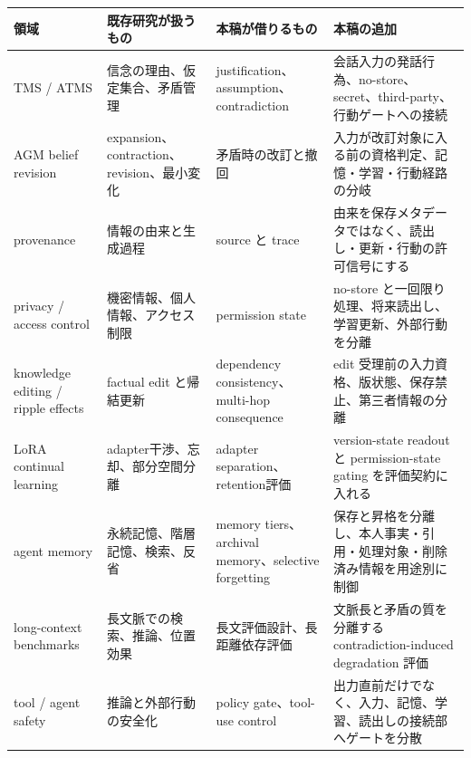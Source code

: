 \documentclass[12pt,a4paper]{article}
\begin{document}
{\def\LTcaptype{table} %
\begin{longtable}[]{@{}
  >{\raggedright\arraybackslash}p{}
  >{\raggedright\arraybackslash}p{}
  >{\raggedright\arraybackslash}p{}
  >{\raggedright\arraybackslash}p{}@{}}
\toprule\noalign{}
\begin{minipage}[b]{\linewidth}\raggedright
領域
\end{minipage} & \begin{minipage}[b]{\linewidth}\raggedright
既存研究が扱うもの
\end{minipage} & \begin{minipage}[b]{\linewidth}\raggedright
本稿が借りるもの
\end{minipage} & \begin{minipage}[b]{\linewidth}\raggedright
本稿の追加
\end{minipage} \\
\midrule\noalign{}
\endhead
\bottomrule\noalign{}
\endlastfoot
TMS / ATMS & 信念の理由、仮定集合、矛盾管理 & justification、assumption、contradiction & 会話入力の発話行為、no-store、secret、third-party、行動ゲートへの接続 \\
AGM belief revision & expansion、contraction、revision、最小変化 & 矛盾時の改訂と撤回 & 入力が改訂対象に入る前の資格判定、記憶・学習・行動経路の分岐 \\
provenance & 情報の由来と生成過程 & source と trace & 由来を保存メタデータではなく、読出し・更新・行動の許可信号にする \\
privacy / access control & 機密情報、個人情報、アクセス制限 & permission state & no-store と一回限り処理、将来読出し、学習更新、外部行動を分離 \\
knowledge editing / ripple effects & factual edit と帰結更新 & dependency consistency、multi-hop consequence & edit 受理前の入力資格、版状態、保存禁止、第三者情報の分離 \\
LoRA continual learning & adapter干渉、忘却、部分空間分離 & adapter separation、retention評価 & version-state readout と permission-state gating を評価契約に入れる \\
agent memory & 永続記憶、階層記憶、検索、反省 & memory tiers、archival memory、selective forgetting & 保存と昇格を分離し、本人事実・引用・処理対象・削除済み情報を用途別に制御 \\
long-context benchmarks & 長文脈での検索、推論、位置効果 & 長文評価設計、長距離依存評価 & 文脈長と矛盾の質を分離する contradiction-induced degradation 評価 \\
tool / agent safety & 推論と外部行動の安全化 & policy gate、tool-use control & 出力直前だけでなく、入力、記憶、学習、読出しの接続部へゲートを分散 \\
\end{longtable}
}
\end{document}
